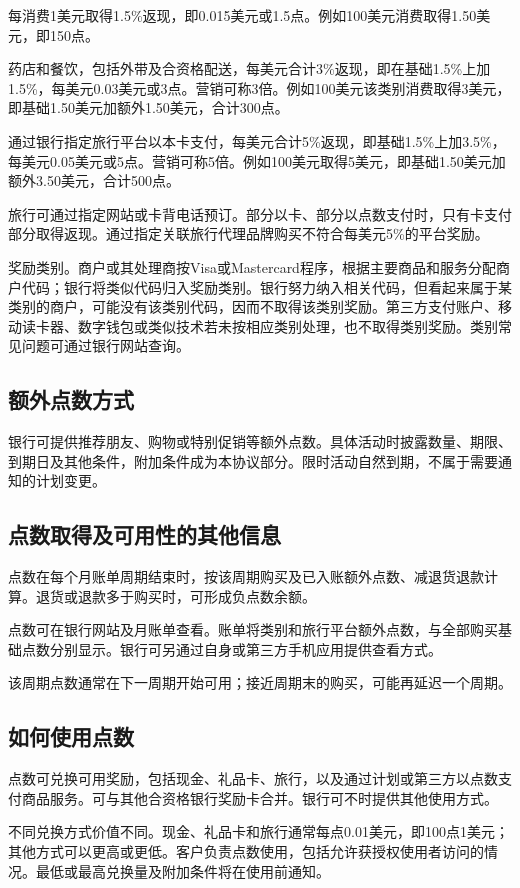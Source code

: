 \documentclass[UTF8,fontset=none,11pt,a4paper]{ctexart}
\begin{document}
每消费1美元取得1.5\%返现，即0.015美元或1.5点。例如100美元消费取得1.50美元，即150点。


药店和餐饮，包括外带及合资格配送，每美元合计3\%返现，即在基础1.5\%上加1.5\%，每美元0.03美元或3点。营销可称3倍。例如100美元该类别消费取得3美元，即基础1.50美元加额外1.50美元，合计300点。


通过银行指定旅行平台以本卡支付，每美元合计5\%返现，即基础1.5\%上加3.5\%，每美元0.05美元或5点。营销可称5倍。例如100美元取得5美元，即基础1.50美元加额外3.50美元，合计500点。


旅行可通过指定网站或卡背电话预订。部分以卡、部分以点数支付时，只有卡支付部分取得返现。通过指定关联旅行代理品牌购买不符合每美元5\%的平台奖励。


奖励类别。商户或其处理商按Visa或Mastercard程序，根据主要商品和服务分配商户代码；银行将类似代码归入奖励类别。银行努力纳入相关代码，但看起来属于某类别的商户，可能没有该类别代码，因而不取得该类别奖励。第三方支付账户、移动读卡器、数字钱包或类似技术若未按相应类别处理，也不取得类别奖励。类别常见问题可通过银行网站查询。


\subsection*{额外点数方式}
银行可提供推荐朋友、购物或特别促销等额外点数。具体活动时披露数量、期限、到期日及其他条件，附加条件成为本协议部分。限时活动自然到期，不属于需要通知的计划变更。


\subsection*{点数取得及可用性的其他信息}
点数在每个月账单周期结束时，按该周期购买及已入账额外点数、减退货退款计算。退货或退款多于购买时，可形成负点数余额。


点数可在银行网站及月账单查看。账单将类别和旅行平台额外点数，与全部购买基础点数分别显示。银行可另通过自身或第三方手机应用提供查看方式。


该周期点数通常在下一周期开始可用；接近周期末的购买，可能再延迟一个周期。


\subsection*{如何使用点数}
点数可兑换可用奖励，包括现金、礼品卡、旅行，以及通过计划或第三方以点数支付商品服务。可与其他合资格银行奖励卡合并。银行可不时提供其他使用方式。


不同兑换方式价值不同。现金、礼品卡和旅行通常每点0.01美元，即100点1美元；其他方式可以更高或更低。客户负责点数使用，包括允许获授权使用者访问的情况。最低或最高兑换量及附加条件将在使用前通知。
\end{document}
